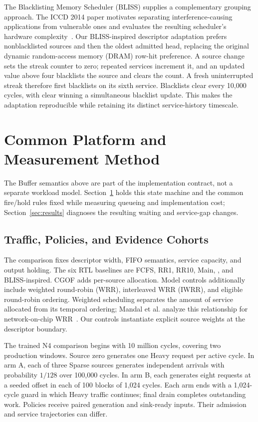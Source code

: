 The Blacklisting Memory Scheduler (BLISS) supplies a complementary grouping approach. The ICCD 2014 paper motivates separating interference-causing applications from vulnerable ones and evaluates the resulting scheduler's hardware complexity~\cite{bliss}. Our BLISS-inspired descriptor adaptation prefers nonblacklisted sources and then the oldest admitted head, replacing the original dynamic random-access memory (DRAM) row-hit preference. A source change sets the streak counter to zero; repeated services increment it, and an updated value above four blacklists the source and clears the count. A fresh uninterrupted streak therefore first blacklists on its sixth service. Blacklists clear every 10,000 cycles, with clear winning a simultaneous blacklist update. This makes the adaptation reproducible while retaining its distinct service-history timescale.

\section{Common Platform and Measurement Method}
\label{sec:method}
The Buffer semantics above are part of the implementation contract, not a separate workload model. Section~\ref{sec:method} holds this state machine and the common fire/hold rules fixed while measuring queueing and implementation cost; Section~\ref{sec:results} diagnoses the resulting waiting and service-gap changes.
\subsection{Traffic, Policies, and Evidence Cohorts}
The comparison fixes descriptor width, FIFO semantics, service capacity, and output holding. The six RTL baselines are FCFS, RR1, RR10, Main, \Alg, and BLISS-inspired. CGOF adds per-source allocation. Model controls additionally include weighted round-robin (WRR), interleaved WRR (IWRR), and eligible round-robin ordering. Weighted scheduling separates the amount of service allocated from its temporal ordering; Mandal et al. analyze this relationship for network-on-chip WRR~\cite{wrr_mandal}. Our controls instantiate explicit source weights at the descriptor boundary.

The trained N4 comparison begins with 10 million cycles, covering two production windows. Source zero generates one Heavy request per active cycle. In arm A, each of three Sparse sources generates independent arrivals with probability $1/128$ over 100,000 cycles. In arm B, each generates eight requests at a seeded offset in each of 100 blocks of 1,024 cycles. Each arm ends with a 1,024-cycle guard in which Heavy traffic continues; final drain completes outstanding work. Policies receive paired generation and sink-ready inputs. Their admission and service trajectories can differ.

